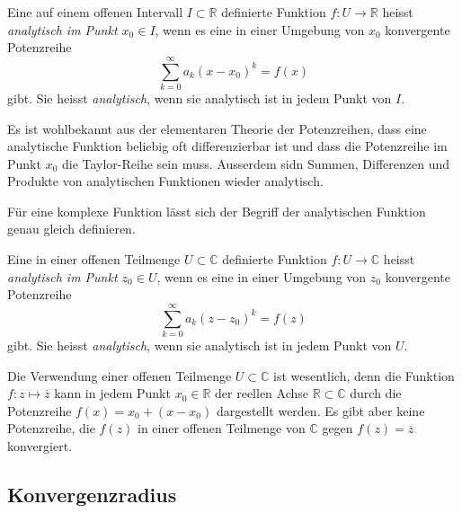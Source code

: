 %
%
\begin{definition}
Eine auf einem offenen Intervall $I\subset \mathbb {R}$ definierte Funktion
$f\colon U\to\mathbb{R}$ heisst {\em analytisch im Punkt  $x_0\in I$}, wenn
es eine in einer Umgebung von $x_0$ konvergente Potenzreihe
\[
\sum_{k=0}^\infty a_k(x-x_0)^k = f(x)
\]
gibt.
Sie heisst {\em analytisch}, wenn sie analytisch ist in jedem Punkt von $I$.
\end{definition}

Es ist wohlbekannt aus der elementaren Theorie der Potenzreihen, dass
eine analytische Funktion beliebig oft differenzierbar ist und dass
die Potenzreihe im Punkt $x_0$ die Taylor-Reihe sein muss.
Ausserdem sidn Summen, Differenzen und Produkte von analytischen Funktionen
wieder analytisch.

Für eine komplexe Funktion lässt sich der Begriff der
analytischen Funktion genau gleich definieren.

\begin{definition}
Eine in einer offenen Teilmenge $U\subset \mathbb{C}$ definierte Funktion
$f\colon U\to\mathbb{C}$ heisst {\em analytisch im Punkt $z_0\in U$}, wenn
es eine in einer Umgebung von $z_0$ konvergente Potenzreihe
\[
\sum_{k=0}^\infty a_k(z-z_0)^k = f(z)
\]
gibt.
Sie heisst {\em analytisch}, wenn sie analytisch ist in jedem Punkt von $U$.
\end{definition}

Die Verwendung einer offenen Teilmenge $U\subset\mathbb{C}$ ist wesentlich,
denn die Funktion $f\colon z\mapsto \overline{z}$ kann in jedem Punkt
$x_0\in\mathbb{R}$
der reellen Achse $\mathbb{R}\subset\mathbb{C}$ durch die Potenzreihe 
$f(x) = x_0 + (x-x_0)$ dargestellt werden.
Es gibt aber keine Potenzreihe, die $f(z)$ in einer offenen Teilmenge
von $\mathbb{C}$ gegen $f(z)=\overline{z}$ konvergiert.

%
%
\subsection{Konvergenzradius
\label{buch:funktionentheorie:subsection:konvergenzradius}}



